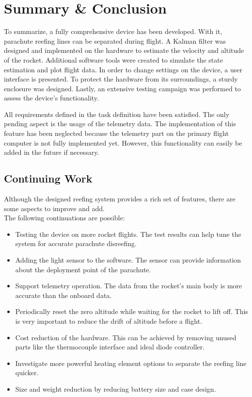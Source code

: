 \chapter{Summary \& Conclusion}
To summarize, a fully comprehensive device has been developed. With it, parachute reefing lines can be separated during flight. A Kalman filter was designed and implemented on the hardware to estimate the velocity and altitude of the rocket. Additional software tools were created to simulate the state estimation and plot flight data. In order to change settings on the device, a user interface is presented. To protect the hardware from its surroundings, a sturdy enclosure was designed. Lastly, an extensive testing campaign was performed to assess the device's functionality.

All requirements defined in the task definition have been satisfied. The only pending aspect is the usage of the telemetry data. The implementation of this feature has been neglected because the telemetry part on the primary flight computer is not fully implemented yet. However, this functionality can easily be added in the future if necessary.

\section{Continuing Work}
Although the designed reefing system provides a rich set of features, there are some aspects to improve and add.\\
The following continuations are possible:

\begin{itemize}
		\item Testing the device on more rocket flights. The test results can help tune the system for accurate parachute disreefing. 
		\item Adding the light sensor to the software. The sensor can provide information about the deployment point of the parachute.  
		\item Support telemetry operation. The data from the rocket's main body is more accurate than the onboard data.
		\item Periodically reset the zero altitude while waiting for the rocket to lift off. This is very important to reduce the drift of altitude before a flight. 
		\item Cost reduction of the hardware. This can be achieved by removing unused parts like the thermocouple interface and ideal diode controller.
		\item Investigate more powerful heating element options to separate the reefing line quicker.
		\item Size and weight reduction by reducing battery size and case design. 
\end{itemize}

